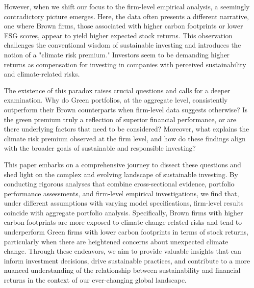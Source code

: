 \documentclass[12pt]{article}
\begin{document}
However, when we shift our focus to the firm-level empirical analysis, a seemingly contradictory picture emerges. Here, the data often presents a different narrative, one where Brown firms, those associated with higher carbon footprints or lower ESG scores, appear to yield higher expected stock returns. This observation challenges the conventional wisdom of sustainable investing and introduces the notion of a "climate risk premium." Investors seem to be demanding higher returns as compensation for investing in companies with perceived sustainability and climate-related risks.

The existence of this paradox raises crucial questions and calls for a deeper examination. Why do Green portfolios, at the aggregate level, consistently outperform their Brown counterparts when firm-level data suggests otherwise? Is the green premium truly a reflection of superior financial performance, or are there underlying factors that need to be considered? Moreover, what explains the climate risk premium observed at the firm level, and how do these findings align with the broader goals of sustainable and responsible investing?

This paper embarks on a comprehensive journey to dissect these questions and shed light on the complex and evolving landscape of sustainable investing. By conducting rigorous analyses that combine cross-sectional evidence, portfolio performance assessments, and firm-level empirical investigations, we find that, under different assumptions with varying model specifications, firm-level results coincide with aggregate portfolio analysis. Specifically, Brown firms with higher carbon footprints are more exposed to climate change-related risks and tend to underperform Green firms with lower carbon footprints in terms of stock returns, particularly when there are heightened concerns about unexpected climate change. Through these endeavors, we aim to provide valuable insights that can inform investment decisions, drive sustainable practices, and contribute to a more nuanced understanding of the relationship between sustainability and financial returns in the context of our ever-changing global landscape.
\clearpage
\begingroup
{}


\endgroup

\clearpage
\setcounter{figure}{0}
\setcounter{table}{0}
\renewcommand\thetable{\Alph{section}.\arabic{table}}
\renewcommand\thefigure{\Alph{section}.\arabic{figure}}
\end{document}
